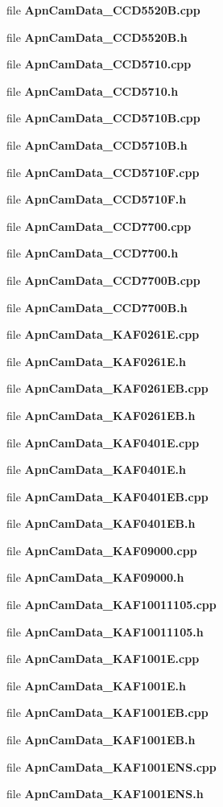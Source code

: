 \begin{CompactItemize}
file {\bf Apn\-Cam\-Data\_\-CCD5520B.cpp}
\item 
file {\bf Apn\-Cam\-Data\_\-CCD5520B.h}
\item 
file {\bf Apn\-Cam\-Data\_\-CCD5710.cpp}
\item 
file {\bf Apn\-Cam\-Data\_\-CCD5710.h}
\item 
file {\bf Apn\-Cam\-Data\_\-CCD5710B.cpp}
\item 
file {\bf Apn\-Cam\-Data\_\-CCD5710B.h}
\item 
file {\bf Apn\-Cam\-Data\_\-CCD5710F.cpp}
\item 
file {\bf Apn\-Cam\-Data\_\-CCD5710F.h}
\item 
file {\bf Apn\-Cam\-Data\_\-CCD7700.cpp}
\item 
file {\bf Apn\-Cam\-Data\_\-CCD7700.h}
\item 
file {\bf Apn\-Cam\-Data\_\-CCD7700B.cpp}
\item 
file {\bf Apn\-Cam\-Data\_\-CCD7700B.h}
\item 
file {\bf Apn\-Cam\-Data\_\-KAF0261E.cpp}
\item 
file {\bf Apn\-Cam\-Data\_\-KAF0261E.h}
\item 
file {\bf Apn\-Cam\-Data\_\-KAF0261EB.cpp}
\item 
file {\bf Apn\-Cam\-Data\_\-KAF0261EB.h}
\item 
file {\bf Apn\-Cam\-Data\_\-KAF0401E.cpp}
\item 
file {\bf Apn\-Cam\-Data\_\-KAF0401E.h}
\item 
file {\bf Apn\-Cam\-Data\_\-KAF0401EB.cpp}
\item 
file {\bf Apn\-Cam\-Data\_\-KAF0401EB.h}
\item 
file {\bf Apn\-Cam\-Data\_\-KAF09000.cpp}
\item 
file {\bf Apn\-Cam\-Data\_\-KAF09000.h}
\item 
file {\bf Apn\-Cam\-Data\_\-KAF10011105.cpp}
\item 
file {\bf Apn\-Cam\-Data\_\-KAF10011105.h}
\item 
file {\bf Apn\-Cam\-Data\_\-KAF1001E.cpp}
\item 
file {\bf Apn\-Cam\-Data\_\-KAF1001E.h}
\item 
file {\bf Apn\-Cam\-Data\_\-KAF1001EB.cpp}
\item 
file {\bf Apn\-Cam\-Data\_\-KAF1001EB.h}
\item 
file {\bf Apn\-Cam\-Data\_\-KAF1001ENS.cpp}
\item 
file {\bf Apn\-Cam\-Data\_\-KAF1001ENS.h}

\end{CompactItemize}
